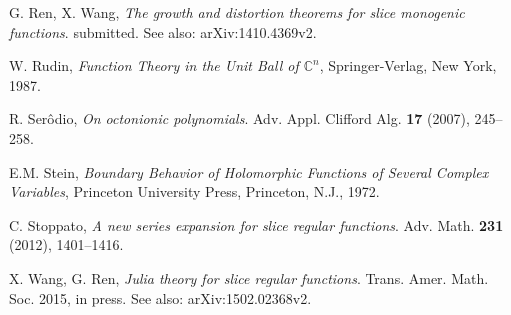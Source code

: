\documentclass{amsart}
\theoremstyle{definition}
\theoremstyle{remark}
\numberwithin{equation}{section}
\begin{document}
\begin{thebibliography}{99}
 G. Ren, X. Wang, \textit{The growth and distortion  theorems for slice monogenic functions}. submitted. See also:  arXiv:1410.4369v2.

 W. Rudin, \textit{Function Theory in the Unit Ball of $\mathbb C^n$}, Springer-Verlag, New York, 1987.

 R.  Ser\^{o}dio, \textit{On octonionic polynomials}. Adv. Appl. Clifford Alg. \textbf{17} (2007), 245--258.

 E.M. Stein, \textit{Boundary Behavior of Holomorphic Functions of Several Complex Variables}, Princeton University Press, Princeton, N.J., 1972.

 C. Stoppato, \textit{A new series expansion for slice regular functions}. Adv. Math. \textbf{231} (2012), 1401--1416.

  X. Wang, G. Ren, \textit{Julia theory for slice regular functions}. Trans. Amer. Math. Soc. 2015, in press. See also: arXiv:1502.02368v2.

\end{thebibliography}
\end{document}
